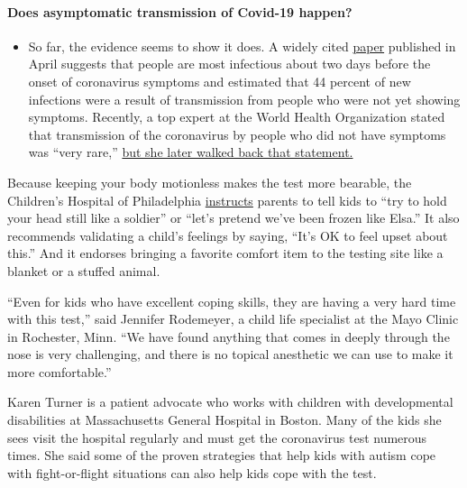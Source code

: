 \begin{itemize}
{  \paragraph{Does asymptomatic transmission of Covid-19
  happen?}\label{does-asymptomatic-transmission-of-covid-19-happen}}

  \begin{itemize}
  \tightlist
  \item
    So far, the evidence seems to show it does. A widely cited
    \href{https://www.nature.com/articles/s41591-020-0869-5}{paper}
    published in April suggests that people are most infectious about
    two days before the onset of coronavirus symptoms and estimated that
    44 percent of new infections were a result of transmission from
    people who were not yet showing symptoms. Recently, a top expert at
    the World Health Organization stated that transmission of the
    coronavirus by people who did not have symptoms was ``very rare,''
    \href{https://www.nytimes.com/2020/06/09/world/coronavirus-updates.html?action=click\&pgtype=Article\&state=default\&region=MAIN_CONTENT_3\&context=storylines_faq\#link-1f302e21}{but
    she later walked back that statement.}
  \end{itemize}
\end{itemize}

Because keeping your body motionless makes the test more bearable, the
Children's Hospital of Philadelphia
\href{https://www.chop.edu/health-resources/preparing-your-child-drive-thru-covid-19-testing}{instructs}
parents to tell kids to ``try to hold your head still like a soldier''
or ``let's pretend we've been frozen like Elsa.'' It also recommends
validating a child's feelings by saying, ``It's OK to feel upset about
this.'' And it endorses bringing a favorite comfort item to the testing
site like a blanket or a stuffed animal.

``Even for kids who have excellent coping skills, they are having a very
hard time with this test,'' said Jennifer Rodemeyer, a child life
specialist at the Mayo Clinic in Rochester, Minn. ``We have found
anything that comes in deeply through the nose is very challenging, and
there is no topical anesthetic we can use to make it more comfortable.''

Karen Turner is a patient advocate who works with children with
developmental disabilities at Massachusetts General Hospital in Boston.
Many of the kids she sees visit the hospital regularly and must get the
coronavirus test numerous times. She said some of the proven strategies
that help kids with autism cope with fight-or-flight situations can also
help kids cope with the test.

